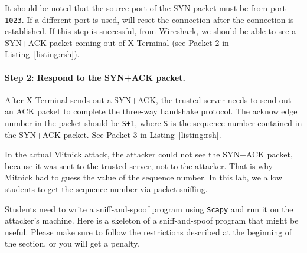It should be noted that the source port of the SYN packet 
must be from port \texttt{1023}. If a different port 
is used, \rsh will reset the connection 
after the connection is established.  If this step is successful, 
from Wireshark, we should be
able to see a SYN+ACK packet coming out of 
X-Terminal (see Packet 2 in Listing~\ref{listing:rsh}).


\paragraph{Step 2: Respond to the SYN+ACK packet.}
After X-Terminal sends out a SYN+ACK, the trusted server needs 
to send out an ACK packet to complete the three-way handshake protocol. 
The acknowledge number in the packet should be \texttt{S+1}, where 
\texttt{S} is the sequence number contained in the SYN+ACK packet. 
See Packet 3 in Listing~\ref{listing:rsh}.

In the actual Mitnick attack, the attacker could not see the SYN+ACK packet, because
it was sent to the trusted server, not to the attacker. 
That is why Mitnick had to guess the value of the sequence number.
In this lab, we allow students to get 
the sequence number via packet sniffing. 

Students need to write a sniff-and-spoof program using \texttt{Scapy} and run it
on the attacker's machine. Here is a skeleton of a sniff-and-spoof program that might be
useful. Please make sure to follow the restrictions described at the
beginning of the section, or you will get a penalty. 


